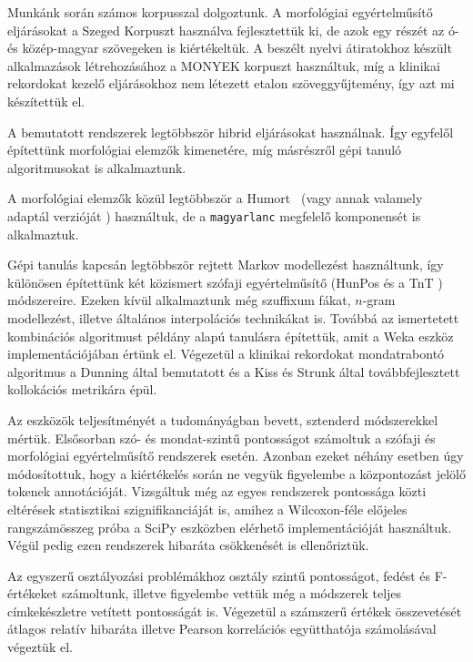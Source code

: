 Munkánk során számos korpusszal dolgoztunk.
A morfológiai egyértelműsítő eljárásokat a Szeged Korpuszt \cite{Csendes2004} használva fejlesztettük ki, de azok egy részét az ó- és közép-magyar szövegeken \cite{Novak2013} is kiértékeltük.
A beszélt nyelvi átiratokhoz készült alkalmazások létrehozásához a MONYEK korpuszt \cite{Matyus2014} használtuk, míg a klinikai rekordokat kezelő eljárásokhoz nem létezett etalon szöveggyűjtemény, így azt mi készítettük el.

A bemutatott rendszerek legtöbbször hibrid eljárásokat használnak. 
Így egyfelől építettünk morfológiai elemzők kimenetére, míg másrészről gépi tanuló algoritmusokat is alkalmaztunk.

A morfológiai elemzők közül legtöbbször a Humort~\cite{Proszeky1994,Novak2003,Proszeky2005} (vagy annak valamely adaptál verzióját \cite{Novak2013,NovakOMK,Orosz2013}) használtuk, de a \texttt{magyarlanc} \cite{zsibrata2013magyarlanc} megfelelő komponensét is alkalmaztuk. 

Gépi tanulás kapcsán legtöbbször rejtett Markov modellezést \cite{Rabiner1989,Samuelsson1993}  használtunk, így különösen építettünk két közismert szófaji egyértelműsítő (HunPos  \cite{Halacsy2007} és a TnT \cite{Brants2000}) módszereire.
Ezeken kívül alkalmaztunk még szuffixum fákat, $n$-gram modellezést, illetve általános interpolációs technikákat is.
Továbbá az ismertetett kombinációs algoritmust példány alapú tanulásra \cite{Aha1991} építettük, amit a Weka \cite{Hall2009} eszköz implementációjában értünk el.
Végezetül a klinikai rekordokat mondatrabontó algoritmus a Dunning által bemutatott \cite{dunning1993accurate} és a Kiss és Strunk által továbbfejlesztett \cite{kiss2006unsupervised} kollokációs metrikára épül.

Az eszközök teljesítményét a tudományágban bevett, sztenderd módszerekkel mértük.
Elsősorban szó- és mondat-szintű pontosságot számoltuk a szófaji és morfológiai egyértelműsítő rendszerek esetén.
Azonban ezeket néhány esetben úgy módosítottuk, hogy a kiértékelés során ne vegyük figyelembe a központozást jelölő tokenek annotációját.
Vizsgáltuk még az egyes rendszerek pontossága közti eltérések statisztikai szignifikanciáját is, amihez a Wilcoxon-féle előjeles rangszámösszeg próba a SciPy \cite{scipy} eszközben elérhető implementációját használtuk.
Végül pedig ezen rendszerek hibaráta csökkenését is ellenőriztük.

Az egyszerű osztályozási problémákhoz osztály szintű pontosságot, fedést és F-értékeket számoltunk, illetve figyelembe vettük még a módszerek teljes címkekészletre vetített pontosságát is.
Végezetül a számszerű értékek összevetését átlagos relatív hibaráta \cite{Witten2011} illetve
Pearson korrelációs együtthatója \cite{Witten2011} számolásával végeztük el.